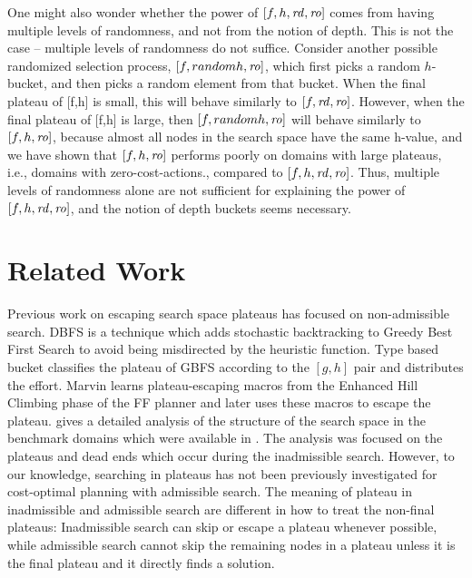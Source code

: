 One might also wonder whether the power of $[f,h,\mbox{\textit{rd}},\mbox{\textit{ro}}]$ comes from having multiple levels of randomness, and not from the notion of depth.
This is not the case -- multiple levels of randomness do not suffice.
Consider another possible randomized selection process, $[f,randomh,\mbox{\textit{ro}}]$, which first picks a random $h$-bucket, 
and then picks a random element from that bucket.
When the final plateau of [f,h] is small, this will behave similarly to $[f,\mbox{\textit{rd}},\mbox{\textit{ro}}]$.
However, when the final plateau of [f,h] is large, then $[f,randomh,\mbox{\textit{ro}}]$ will behave similarly to $[f,h,\mbox{\textit{ro}}]$, because almost all nodes in the search space have the same h-value, and we have shown that $[f,h,\mbox{\textit{ro}}]$ performs poorly on domains with large plateaus, i.e., domains with zero-cost-actions., compared to $[f,h,\mbox{\textit{rd}},\mbox{\textit{ro}}]$.
Thus, multiple levels of randomness alone are not sufficient for explaining the power of $[f,h,\mbox{\textit{rd}},\mbox{\textit{ro}}]$, and the notion of depth buckets seems necessary.




\section{Related Work}
\label{sec-4}

Previous work on escaping search space plateaus has focused on
non-admissible search.  DBFS \cite{imai2011novel} is a technique which
adds stochastic backtracking to Greedy Best First Search to avoid
being misdirected by the heuristic function. Type based bucket
\cite{xie14type} classifies the plateau of GBFS according to the
$[g,h]$ pair and distributes the effort.  Marvin \cite{Coles07} learns plateau-escaping macros
from the Enhanced Hill Climbing phase of the FF planner
\cite{Hoffmann01} and later uses these macros to escape the plateau.
\citeauthor{Hoffmann05} gives a detailed analysis of the
structure of the search space in the benchmark domains which were
available in \citeyear{Hoffmann05} \cite{Hoffmann05,Hoffmann14}. 
The analysis was focused on the plateaus and dead ends which occur during the inadmissible search.
% 
However, to our knowledge, searching in plateaus has not been
previously investigated for cost-optimal planning with admissible
search.
The meaning of plateau in inadmissible and admissible search are
different in how to treat the non-final plateaus: Inadmissible search can
skip or escape a plateau whenever possible, while
admissible search cannot skip the remaining nodes in a plateau unless it
is the final plateau and it directly finds a solution.

